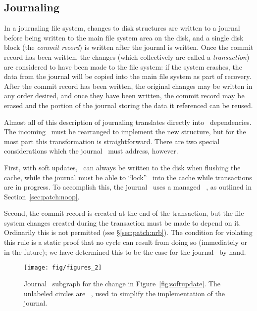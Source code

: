 
\subsection{Journaling}
\label{sec:using:journal}

In a journaling file system, changes to disk structures are written to a journal
before being written to the main file system area on the disk, and a single disk
block (the \emph{commit record}) is written after the journal is written. Once
the commit record has been written, the changes (which collectively are called a
\emph{transaction}) are considered to have been made to the file system: if the
system crashes, the data from the journal will be copied into the main file
system as part of recovery. After the commit record has been written, the
original changes may be written in any order desired, and once they have been
written, the commit record may be erased and the portion of the journal storing
the data it referenced can be reused.

Almost all of this description of journaling translates directly into \chdesc\
dependencies. The incoming \chdescs\ must be rearranged to implement the new
structure, but for the most part this transformation is straightforward. There
are two special considerations which the journal \module\ must address, however.

First, with soft updates, \chdescs\ can always be written to the disk when
flushing the cache, while the journal must be able to ``lock'' \chdescs\ into
the cache while transactions are in progress. To accomplish this, the journal
\module\ uses a managed \noop\ \chdesc, as outlined in
Section~\ref{sec:patch:noop}.

Second, the commit record is created at the end of the transaction, but the file
system changes created during the transaction must be made to depend on it.
Ordinarily this is not permitted (see \S\ref{sec:patch:nrb}). The condition for
violating this rule is a static proof that no cycle can result from doing so
(immediately or in the future); we have determined this to be the case for the
journal \module\ by hand.

\begin{figure}
  \centering
  \texttt{[image: fig/figures\_2]}
  \caption{\label{fig:journal} Journal \chdesc\ subgraph for the
    change in Figure~\ref{fig:softupdate}. The unlabeled circles are
    \noop\ \chdescs, used to simplify the implementation of the journal.}
\end{figure}


